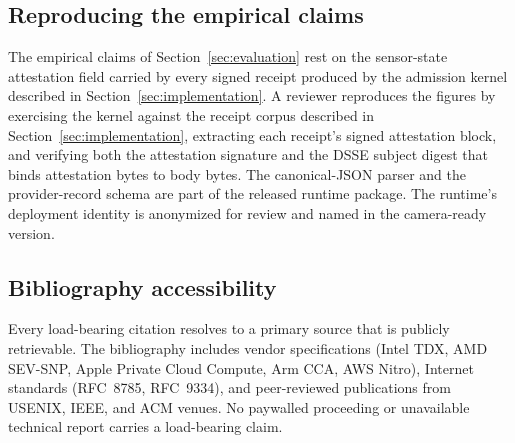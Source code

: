 \subsection{Reproducing the empirical claims}
\label{sec:open-science:empirical}

The empirical claims of Section~\ref{sec:evaluation} rest on the
sensor-state attestation field carried by every signed receipt produced
by the admission kernel described in Section~\ref{sec:implementation}.
A reviewer reproduces the figures by exercising the kernel against the
receipt corpus described in Section~\ref{sec:implementation},
extracting each receipt's signed attestation block, and verifying both
the attestation signature and the DSSE subject digest that binds
attestation bytes to body bytes. The canonical-JSON parser and the
provider-record schema are part of the released runtime package. The
runtime's deployment identity is anonymized for review and named in
the camera-ready version.

\subsection{Bibliography accessibility}
\label{sec:open-science:bib}

Every load-bearing citation resolves to a primary source that is
publicly retrievable. The bibliography includes vendor specifications
(Intel TDX, AMD SEV-SNP, Apple Private Cloud Compute, Arm CCA, AWS
Nitro), Internet standards (RFC~8785, RFC~9334), and peer-reviewed
publications from USENIX, IEEE, and ACM venues. No paywalled
proceeding or unavailable technical report carries a load-bearing
claim.
